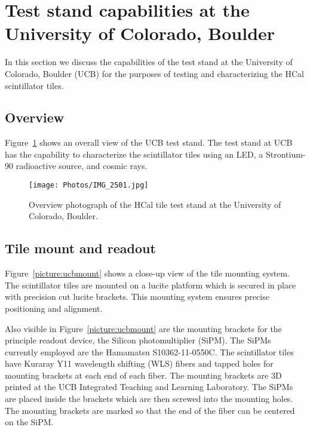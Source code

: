 \documentclass[12pt]{article}
\begin{document}
\section{Test stand capabilities at the University of Colorado, Boulder}

In this section we discuss the capabilities of the test stand at the University of
Colorado, Boulder (UCB) for the purposes of testing and characterizing the HCal
scintillator tiles.


\subsection{Overview}

Figure~\ref{picture:ucbstand1} shows an overall view of the UCB test stand.  The test
stand at UCB has the capability to characterize the scintillator tiles using an LED, a
Strontium-90 radioactive source, and cosmic rays.

\begin{figure}
\begin{center}
\texttt{[image: Photos/IMG\_2501.jpg]}
\end{center}
\caption{Overview photograph of the HCal tile test stand at the University of Colorado,
  Boulder.}
\label{picture:ucbstand1}
\end{figure}


\subsection{Tile mount and readout}

Figure~\ref{picture:ucbmount} shows a close-up view of the tile mounting system.  The
scintillator tiles are mounted on a lucite platform which is secured in place with
precision cut lucite brackets.  This mounting system ensures precise positioning and
alignment.

Also visible in Figure~\ref{picture:ucbmount} are the mounting brackets for the principle
readout device, the Silicon photomultiplier (SiPM).  The SiPMs currently employed are the
Hamamatsu S10362-11-0550C.  The scintillator tiles have Kuraray Y11 wavelength shifting
(WLS) fibers and tapped holes for mounting brackets at each end of each fiber.  The
mounting brackets are 3D printed at the UCB Integrated Teaching and Learning Laboratory.
The SiPMs are placed inside the brackets which are then screwed into the mounting holes.
The mounting brackets are marked so that the end of the fiber can be centered on the SiPM.
\end{document}
